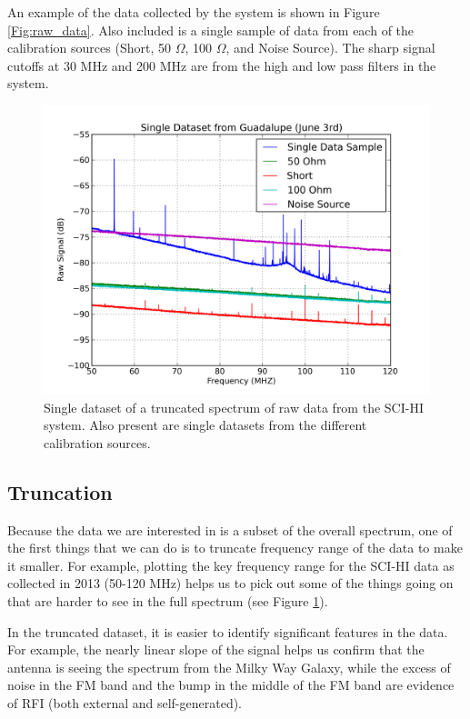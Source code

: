 An example of the data collected by the system is shown in Figure \ref{Fig:raw_data}. Also included is a single sample of data from each of the calibration sources (Short, 50 $\Omega$, 100 $\Omega$, and Noise Source). The sharp signal cutoffs at 30 MHz and 200 MHz are from the high and low pass filters in the system.

\begin{figure}[htb]
\begin{center}
\includegraphics[width=0.9\linewidth]{Data_analysis/figures/single_raw_trunc_guad_june03.png}
\caption{Single dataset of a truncated spectrum of raw data from the SCI-HI system. Also present are single datasets from the different calibration sources.}
\label{Fig:raw_data_trunc}
\end{center}
\end{figure}

\subsection{Truncation}

Because the data we are interested in is a subset of the overall spectrum, one of the first things that we can do is to truncate frequency range of the data to make it smaller. For example, plotting the key frequency range for the SCI-HI data as collected in 2013 (50-120 MHz) helps us to pick out some of the things going on that are harder to see in the full spectrum (see Figure \ref{Fig:raw_data_trunc}). 

In the truncated dataset, it is easier to identify significant features in the data. For example, the nearly linear slope of the signal helps us confirm that the antenna is seeing the spectrum from the Milky Way Galaxy, while the excess of noise in the FM band and the bump in the middle of the FM band are evidence of RFI (both external and self-generated). 

